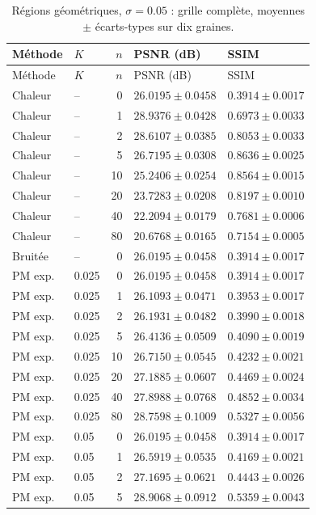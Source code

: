 \begin{longtable}{llrll}
\caption{Régions géométriques, $\sigma=0.05$ : grille complète, moyennes $\pm$ écarts-types sur dix graines.}\\
\toprule
Méthode & $K$ & $n$ & PSNR (dB) & SSIM \\
\midrule
\endfirsthead
\toprule
Méthode & $K$ & $n$ & PSNR (dB) & SSIM \\
\midrule
\endhead
\bottomrule
\endfoot
Chaleur & -- & 0 & $26.0195 \pm 0.0458$ & $0.3914 \pm 0.0017$ \\
Chaleur & -- & 1 & $28.9376 \pm 0.0428$ & $0.6973 \pm 0.0033$ \\
Chaleur & -- & 2 & $28.6107 \pm 0.0385$ & $0.8053 \pm 0.0033$ \\
Chaleur & -- & 5 & $26.7195 \pm 0.0308$ & $0.8636 \pm 0.0025$ \\
Chaleur & -- & 10 & $25.2406 \pm 0.0254$ & $0.8564 \pm 0.0015$ \\
Chaleur & -- & 20 & $23.7283 \pm 0.0208$ & $0.8197 \pm 0.0010$ \\
Chaleur & -- & 40 & $22.2094 \pm 0.0179$ & $0.7681 \pm 0.0006$ \\
Chaleur & -- & 80 & $20.6768 \pm 0.0165$ & $0.7154 \pm 0.0005$ \\
Bruitée & -- & 0 & $26.0195 \pm 0.0458$ & $0.3914 \pm 0.0017$ \\
PM exp. & 0.025 & 0 & $26.0195 \pm 0.0458$ & $0.3914 \pm 0.0017$ \\
PM exp. & 0.025 & 1 & $26.1093 \pm 0.0471$ & $0.3953 \pm 0.0017$ \\
PM exp. & 0.025 & 2 & $26.1931 \pm 0.0482$ & $0.3990 \pm 0.0018$ \\
PM exp. & 0.025 & 5 & $26.4136 \pm 0.0509$ & $0.4090 \pm 0.0019$ \\
PM exp. & 0.025 & 10 & $26.7150 \pm 0.0545$ & $0.4232 \pm 0.0021$ \\
PM exp. & 0.025 & 20 & $27.1885 \pm 0.0607$ & $0.4469 \pm 0.0024$ \\
PM exp. & 0.025 & 40 & $27.8988 \pm 0.0768$ & $0.4852 \pm 0.0034$ \\
PM exp. & 0.025 & 80 & $28.7598 \pm 0.1009$ & $0.5327 \pm 0.0056$ \\
PM exp. & 0.05 & 0 & $26.0195 \pm 0.0458$ & $0.3914 \pm 0.0017$ \\
PM exp. & 0.05 & 1 & $26.5919 \pm 0.0535$ & $0.4169 \pm 0.0021$ \\
PM exp. & 0.05 & 2 & $27.1695 \pm 0.0621$ & $0.4443 \pm 0.0026$ \\
PM exp. & 0.05 & 5 & $28.9068 \pm 0.0912$ & $0.5359 \pm 0.0043$ \\

\end{longtable}
